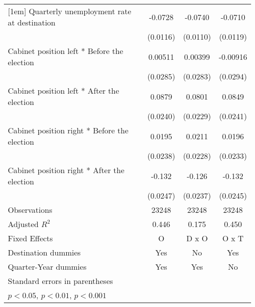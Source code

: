 \begin{table}[htbp]
\begin{tabular}{l*{3}{c}}
[1em]
Quarterly unemployment rate at destination&     -0.0728\sym{***}&     -0.0740\sym{***}&     -0.0710\sym{***}\\
                    &    (0.0116)         &    (0.0110)         &    (0.0119)         \\
[1em]
Cabinet position left * Before the election&     0.00511         &     0.00399         &    -0.00916         \\
                    &    (0.0285)         &    (0.0283)         &    (0.0294)         \\
[1em]
Cabinet position left * After the election&      0.0879\sym{***}&      0.0801\sym{**} &      0.0849\sym{***}\\
                    &    (0.0240)         &    (0.0229)         &    (0.0241)         \\
[1em]
Cabinet position right * Before the election&      0.0195         &      0.0211         &      0.0196         \\
                    &    (0.0238)         &    (0.0228)         &    (0.0233)         \\
[1em]
Cabinet position right * After the election&      -0.132\sym{***}&      -0.126\sym{***}&      -0.132\sym{***}\\
                    &    (0.0247)         &    (0.0237)         &    (0.0245)         \\
\hline
Observations        &       23248         &       23248         &       23248         \\
Adjusted \(R^{2}\)  &       0.446         &       0.175         &       0.450         \\
Fixed Effects       &           O         &       D x O         &       O x T         \\
Destination dummies &         Yes         &          No         &         Yes         \\
Quarter-Year dummies&         Yes         &         Yes         &          No         \\
\hline\hline
\multicolumn{4}{l}{\footnotesize Standard errors in parentheses}\\
\multicolumn{4}{l}{\footnotesize \sym{*} \(p<0.05\), \sym{**} \(p<0.01\), \sym{***} \(p<0.001\)}\\
\end{tabular}
\end{table}
